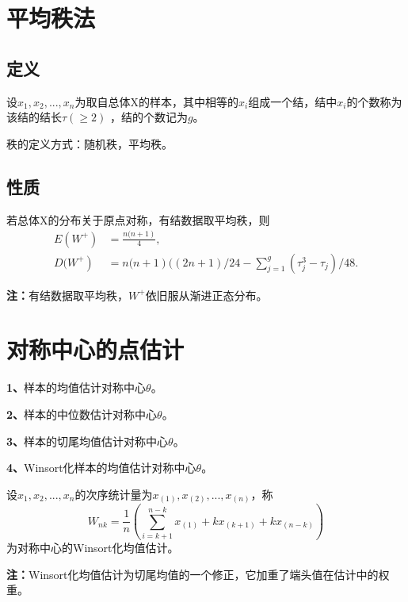\documentclass[lang=cn,10pt]{elegantbook}
\begin{document}
\section{平均秩法}
\subsection{定义}
\begin{definition}
    设$x_1,x_2,...,x_n$为取自总体X的样本，其中相等的$x_i$组成一个结，结中$x_i$的个数称为该结的结长$\tau(\geq 2)$
    ，结的个数记为$g$。
\end{definition}
秩的定义方式：随机秩，平均秩。

\subsection{性质}
\begin{proposition}
    若总体X的分布关于原点对称，有结数据取平均秩，则
    \begin{equation}
        \begin{aligned}
            E(W^+)             & =\frac{n(\left.n+1\right)}4,                                                            \\
            D(\left.W^+\right) & =n(\left.n+1\right)(\left(2n+1\right)/24-\sum_{j=1}^{g}\left(\tau_j^3-\tau_j\right)/48.
        \end{aligned}
    \end{equation}
\end{proposition}
\textbf{注：}有结数据取平均秩，$W^+$依旧服从渐进正态分布。

\section{对称中心的点估计}
\textbf{1、}样本的均值估计对称中心$\theta$。

\textbf{2、}样本的中位数估计对称中心$\theta$。

\textbf{3、}样本的切尾均值估计对称中心$\theta$。

\textbf{4、}Winsort化样本的均值估计对称中心$\theta$。
\begin{definition}
    设$x_1,x_2,...,x_n$的次序统计量为$x_{(1)},x_{(2)},...,x_{(n)}$，称
    \begin{equation}
        W_{nk} = \frac1n(\sum_{i = k+1}^{n-k}x_{(1)} + kx_{(k+1)} + kx_{(n-k)})
    \end{equation}
    为对称中心的Winsort化均值估计。
\end{definition}
\textbf{注：}Winsort化均值估计为切尾均值的一个修正，它加重了端头值在估计中的权重。
\end{document}
